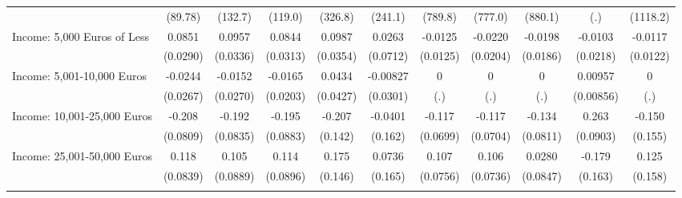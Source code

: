 {\begin{tabular}{l*{10}{c}}
            &     (89.78)         &     (132.7)         &     (119.0)         &     (326.8)         &     (241.1)         &     (789.8)         &     (777.0)         &     (880.1)         &         (.)         &    (1118.2)         \\
\addlinespace
Income: 5,000 Euros of Less&      0.0851\sym{**} &      0.0957\sym{**} &      0.0844\sym{**} &      0.0987\sym{**} &      0.0263         &     -0.0125         &     -0.0220         &     -0.0198         &     -0.0103         &     -0.0117         \\
            &    (0.0290)         &    (0.0336)         &    (0.0313)         &    (0.0354)         &    (0.0712)         &    (0.0125)         &    (0.0204)         &    (0.0186)         &    (0.0218)         &    (0.0122)         \\
\addlinespace
Income: 5,001-10,000 Euros&     -0.0244         &     -0.0152         &     -0.0165         &      0.0434         &    -0.00827         &           0         &           0         &           0         &     0.00957         &           0         \\
            &    (0.0267)         &    (0.0270)         &    (0.0203)         &    (0.0427)         &    (0.0301)         &         (.)         &         (.)         &         (.)         &   (0.00856)         &         (.)         \\
\addlinespace
Income: 10,001-25,000 Euros&      -0.208\sym{*}  &      -0.192\sym{*}  &      -0.195\sym{*}  &      -0.207         &     -0.0401         &      -0.117         &      -0.117         &      -0.134         &       0.263\sym{**} &      -0.150         \\
            &    (0.0809)         &    (0.0835)         &    (0.0883)         &     (0.142)         &     (0.162)         &    (0.0699)         &    (0.0704)         &    (0.0811)         &    (0.0903)         &     (0.155)         \\
\addlinespace
Income: 25,001-50,000 Euros&       0.118         &       0.105         &       0.114         &       0.175         &      0.0736         &       0.107         &       0.106         &      0.0280         &      -0.179         &       0.125         \\
            &    (0.0839)         &    (0.0889)         &    (0.0896)         &     (0.146)         &     (0.165)         &    (0.0756)         &    (0.0736)         &    (0.0847)         &     (0.163)         &     (0.158)         \\
\addlinespace

\end{tabular}}
